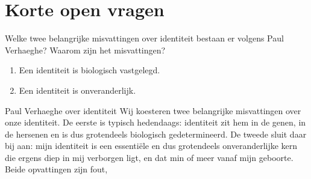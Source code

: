 \documentclass[main.tex]{subfiles}
\begin{document}
\section{Korte open vragen}

\begin{examenvraag}
    \begin{vraag}
        Welke twee belangrijke misvattingen over identiteit bestaan er volgens Paul Verhaeghe? Waarom zijn het misvattingen?
    \end{vraag}

    \begin{antwoord}
        \begin{enumerate}
            \item Een identiteit is biologisch vastgelegd.
            \item Een identiteit is onveranderlijk.
        \end{enumerate}
        \begin{citaat}{Paul Verhaeghe over identiteit}
            Wij koesteren twee belangrijke misvattingen over onze identiteit.
            De eerste is typisch hedendaags: identiteit zit hem in de genen, in de hersenen en is dus grotendeels biologisch gedetermineerd.
            De tweede sluit daar bij aan: mijn identiteit is een essentiële en dus grotendeels onveranderlijke kern die ergens diep in mij verborgen ligt, en dat min of meer vanaf mijn geboorte.
            Beide opvattingen zijn fout,
        \end{citaat}
    \end{antwoord}
\end{examenvraag}
\end{document}
